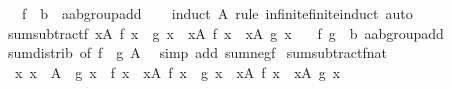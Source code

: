 \begin{isabellebody}
\ \ \ f\ {\isacharcolon}{\kern0pt}{\isacharcolon}{\kern0pt}\ {\isachardoublequoteopen}{\isacharprime}{\kern0pt}b\ {\isasymRightarrow}\ {\isacharprime}{\kern0pt}a{\isacharcolon}{\kern0pt}{\isacharcolon}{\kern0pt}ab{\isacharunderscore}{\kern0pt}group{\isacharunderscore}{\kern0pt}add{\isachardoublequoteclose}\isanewline
%
\isadelimproof
\ \ %
\endisadelimproof
%
\isatagproof
{}\isamarkupfalse%
\ {\isacharparenleft}{\kern0pt}induct\ A\ rule{\isacharcolon}{\kern0pt}\ infinite{\isacharunderscore}{\kern0pt}finite{\isacharunderscore}{\kern0pt}induct{\isacharparenright}{\kern0pt}\ auto%
\endisatagproof
{\isafoldproof}%
%
\isadelimproof
\isanewline
%
\endisadelimproof
\isanewline
{}\isamarkupfalse%
\ sum{\isacharunderscore}{\kern0pt}subtractf{\isacharcolon}{\kern0pt}\ {\isachardoublequoteopen}{\isacharparenleft}{\kern0pt}{\isasymSum}x{\isasymin}A{\isachardot}{\kern0pt}\ f\ x\ {\isacharminus}{\kern0pt}\ g\ x{\isacharparenright}{\kern0pt}\ {\isacharequal}{\kern0pt}\ {\isacharparenleft}{\kern0pt}{\isasymSum}x{\isasymin}A{\isachardot}{\kern0pt}\ f\ x{\isacharparenright}{\kern0pt}\ {\isacharminus}{\kern0pt}\ {\isacharparenleft}{\kern0pt}{\isasymSum}x{\isasymin}A{\isachardot}{\kern0pt}\ g\ x{\isacharparenright}{\kern0pt}{\isachardoublequoteclose}\isanewline
\ \ \ f\ g\ {\isacharcolon}{\kern0pt}{\isacharcolon}{\kern0pt}\ {\isachardoublequoteopen}{\isacharprime}{\kern0pt}b\ {\isasymRightarrow}{\isacharprime}{\kern0pt}a{\isacharcolon}{\kern0pt}{\isacharcolon}{\kern0pt}ab{\isacharunderscore}{\kern0pt}group{\isacharunderscore}{\kern0pt}add{\isachardoublequoteclose}\isanewline
%
\isadelimproof
\ \ %
\endisadelimproof
%
\isatagproof
{}\isamarkupfalse%
\ sum{\isachardot}{\kern0pt}distrib\ {\isacharbrackleft}{\kern0pt}of\ f\ {\isachardoublequoteopen}{\isacharminus}{\kern0pt}\ g{\isachardoublequoteclose}\ A{\isacharbrackright}{\kern0pt}\ \isamarkupfalse%
\ {\isacharparenleft}{\kern0pt}simp\ add{\isacharcolon}{\kern0pt}\ sum{\isacharunderscore}{\kern0pt}negf{\isacharparenright}{\kern0pt}%
\endisatagproof
{\isafoldproof}%
%
\isadelimproof
\isanewline
%
\endisadelimproof
\isanewline
{}\isamarkupfalse%
\ sum{\isacharunderscore}{\kern0pt}subtractf{\isacharunderscore}{\kern0pt}nat{\isacharcolon}{\kern0pt}\isanewline
\ \ {\isachardoublequoteopen}{\isacharparenleft}{\kern0pt}{\isasymAnd}x{\isachardot}{\kern0pt}\ x\ {\isasymin}\ A\ {\isasymLongrightarrow}\ g\ x\ {\isasymle}\ f\ x{\isacharparenright}{\kern0pt}\ {\isasymLongrightarrow}\ {\isacharparenleft}{\kern0pt}{\isasymSum}x{\isasymin}A{\isachardot}{\kern0pt}\ f\ x\ {\isacharminus}{\kern0pt}\ g\ x{\isacharparenright}{\kern0pt}\ {\isacharequal}{\kern0pt}\ {\isacharparenleft}{\kern0pt}{\isasymSum}x{\isasymin}A{\isachardot}{\kern0pt}\ f\ x{\isacharparenright}{\kern0pt}\ {\isacharminus}{\kern0pt}\ {\isacharparenleft}{\kern0pt}{\isasymSum}x{\isasymin}A{\isachardot}{\kern0pt}\ g\ x{\isacharparenright}{\kern0pt}{\isachardoublequoteclose}\isanewline

\end{isabellebody}
